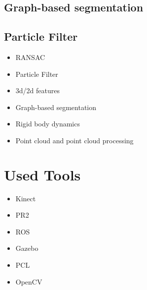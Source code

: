 \subsection{Graph-based segmentation}
\subsection{Particle Filter}

\begin{itemize}
\item RANSAC
\item Particle Filter
\item 3d/2d features
\item Graph-based segmentation
\item Rigid body dynamics
\item Point cloud and point cloud processing
\end{itemize}


\section{Used Tools}
\begin{itemize}
\item Kinect
\item PR2
\item ROS
\item Gazebo
\item PCL
\item OpenCV
\end{itemize}






